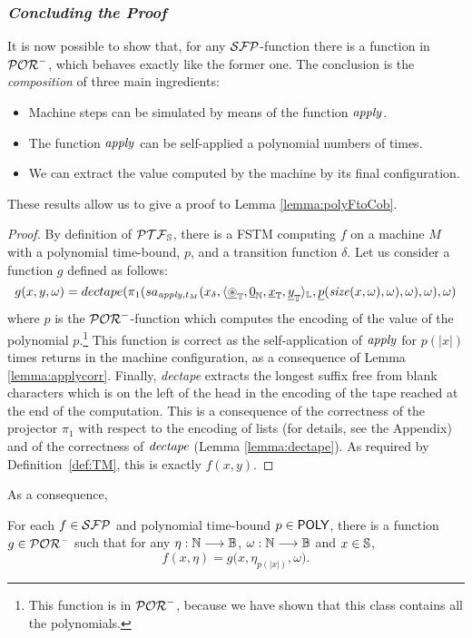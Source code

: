 \subsubsection{\emph{Concluding the Proof}}
It is now possible to show that, for any
$\mathcal{SFP}$-function there is
a function in $\mathcal{POR}^-$,
which behaves exactly like the  former one.
%
The conclusion is the \emph{composition} of three main ingredients:
\begin{itemize}
  \item Machine steps can be simulated by means of the function $\mathit{apply}$.
  \item The function $\mathit{apply}$ can be self-applied a polynomial numbers of times.
  \item We can extract the value computed by the machine by its final configuration.
\end{itemize}

These results allow us to give a proof to Lemma \ref{lemma:polyFtoCob}.



\polyFtoCob*
\begin{proof}
%
By definition of $\mathcal{PTF}_{\mathbb{S}}$,
there is a FSTM computing $f$ on a machine $M$ with a polynomial
time-bound, $p$, and a transition function $\delta$.
%
Let us consider a function $g$
defined as follows:
$$
g(x, y, \omega) = dectape(\pi_{1}(sa_{\mathit{apply}, t_M}(x_\delta,
\langle {\underline {\circledast}}_{\mathbb{T}}, \underline{0}_{\mathbb{N}}, {\underline {x}}_{\mathbb{T}}, {\underline {y}}_{\mathbb{T}}\rangle_{\mathbb{L}},
\underline p(\mathit{size}(x, \omega), \omega), \omega), \omega), \omega)
$$
where $p$ is the $\mathcal{POR}^-$-function which
computes the encoding of the value of the polynomial $p$.\footnote{
This function is in $\mathcal{POR}^-$, because we have shown that this class
contains all the polynomials.}
This function is correct as the self-application of $\mathit{apply}$ for $p(|x|)$
times returns in the machine configuration, as a consequence of Lemma \ref{lemma:applycorr}.
Finally, \emph{dectape}
extracts the longest suffix free from blank characters
which is on the left of the head
in the encoding of the tape reached at the end of the computation.
This is a consequence of the correctness of the projector $\pi_1$
with respect to the encoding of lists (for details, see the Appendix)
and of the correctness of $\mathit{dectape}$ (Lemma \ref{lemma:dectape}).
As required by Definition~\ref{def:TM}, this is exactly $f(x, y)$.
\end{proof}
%
%
%
%
%
\noindent
As a consequence,
\begin{cor}
  \label{cor:sfptopor-}
For each $f\in \mathcal{SFP}$ and polynomial
time-bound $p\in \mathsf{POLY}$,
there is a function $g\in \mathcal{POR}^-$ such that
for any $\eta : \mathbb{N} \longrightarrow \mathbb{B}$, $\omega : \mathbb{N} \longrightarrow \mathbb{B}$ and $x\in\mathbb{S}$,
$$
f(x,\eta) = g\big(x,\eta_{p(|x|)}, \omega\big).
$$
\end{cor}

